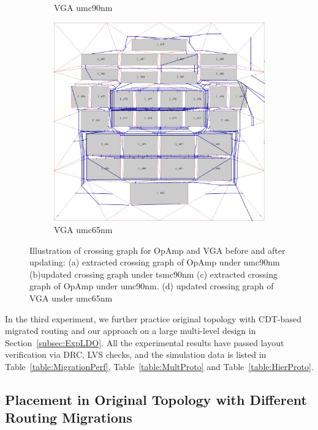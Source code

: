 \begin{figure}[ht]
\begin{subfigure}[t]{0.4\textwidth}
          \caption{VGA umc90nm}\label{fig:OrigVGA}
          \end{subfigure}
          \begin{subfigure}[t]{0.4\textwidth}
          \includegraphics[width=\textwidth]{Fig/VGAProto.eps}
          \caption{VGA umc65nm}\label{fig:VGAProto}
          \end{subfigure}
        \caption{Illustration of crossing graph for OpAmp and VGA before and after updating: (a) extracted crossing graph of OpAmp under umc90nm (b)updated crossing graph under tsmc90nm (c) extracted crossing graph of OpAmp under umc90nm. (d) updated crossing graph of VGA under umc65nm}
        \label{fig:CDTResult}
      \end{figure}

    

    In the third experiment, we further practice original topology with CDT-based migrated routing and our approach on a large multi-level design in Section~\ref{subsec:ExpLDO}. 
    All the experimental results have passed layout verification via DRC, LVS checks, and the simulation data is listed in Table~\ref{table:MigrationPerf}, Table~\ref{table:MultProto} and Table~\ref{table:HierProto}.

    \subsection{Placement in Original Topology with Different Routing Migrations}\label{sec:ExpMigration}


